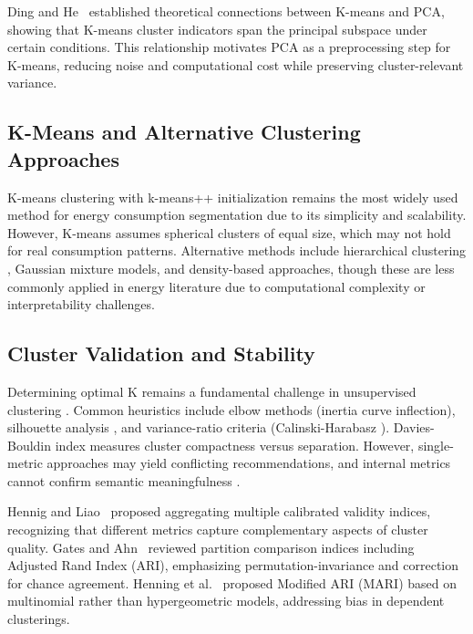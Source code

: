 \documentclass[11pt,a4paper]{article}
\begin{document}
Ding and He~\cite{ding2004kmeans} established theoretical connections between K-means and PCA, showing that K-means cluster indicators span the principal subspace under certain conditions. This relationship motivates PCA as a preprocessing step for K-means, reducing noise and computational cost while preserving cluster-relevant variance.

\subsection{K-Means and Alternative Clustering Approaches}

K-means clustering \cite{lloyd1982least} with k-means++ initialization \cite{arthur2007kmeans} remains the most widely used method for energy consumption segmentation due to its simplicity and scalability. However, K-means assumes spherical clusters of equal size, which may not hold for real consumption patterns. Alternative methods include hierarchical clustering \cite{rhodes2014clustering}, Gaussian mixture models, and density-based approaches, though these are less commonly applied in energy literature due to computational complexity or interpretability challenges.

\subsection{Cluster Validation and Stability}

Determining optimal K remains a fundamental challenge in unsupervised clustering \cite{hennig2020comparing}. Common heuristics include elbow methods (inertia curve inflection), silhouette analysis \cite{rousseeuw1987silhouettes}, and variance-ratio criteria (Calinski-Harabasz \cite{calinski1974dendrite}). Davies-Bouldin index \cite{davies1979cluster} measures cluster compactness versus separation. However, single-metric approaches may yield conflicting recommendations, and internal metrics cannot confirm semantic meaningfulness \cite{gates2019adjusted}.

Hennig and Liao~\cite{hennig2020comparing} proposed aggregating multiple calibrated validity indices, recognizing that different metrics capture complementary aspects of cluster quality. Gates and Ahn~\cite{gates2019adjusted} reviewed partition comparison indices including Adjusted Rand Index (ARI), emphasizing permutation-invariance and correction for chance agreement. Henning et al.~\cite{henning2020adjusting} proposed Modified ARI (MARI) based on multinomial rather than hypergeometric models, addressing bias in dependent clusterings.
\end{document}

